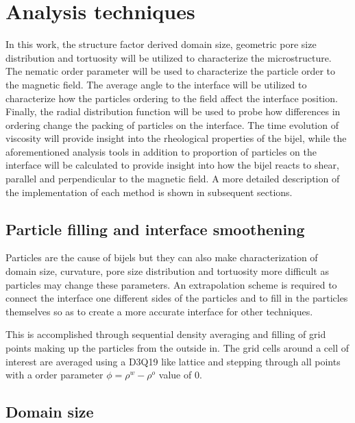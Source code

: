 \section{Analysis techniques}

In this work, the structure factor derived domain size, geometric pore size distribution and tortuosity will be 
utilized to characterize the microstructure. The nematic order parameter will be used to characterize the particle 
order to the magnetic field. The average angle to the interface will be utilized to characterize how the particles 
ordering to the field affect the interface position. Finally, the radial distribution function will be used to probe 
how differences in ordering change the packing of particles on the interface. The time evolution of viscosity will 
provide insight into the rheological properties of the bijel, while the aforementioned analysis tools in addition to 
proportion of particles on the interface will be calculated to provide insight into how the bijel reacts to shear, 
parallel and perpendicular to the magnetic field. A more detailed description of the implementation of each method is 
shown in subsequent sections.

\subsection{Particle filling and interface smoothening}
\label{section:filling_routine}

Particles are the cause of bijels but they can also make characterization of domain size, curvature, pore size 
distribution and tortuosity more difficult as particles may change these parameters. An extrapolation scheme is 
required to connect the interface one different sides of the particles and to fill in the particles themselves so 
as to create a more accurate interface for other techniques.

This is accomplished through sequential density averaging and filling of grid points making up the particles from 
the outside in. The grid cells around a cell of interest are averaged using a D3Q19 like lattice and stepping through 
all points with a order parameter $\phi = \rho^w - \rho^o$ value of 0. 

\subsection{Domain size}
\label{section:domain_size}

